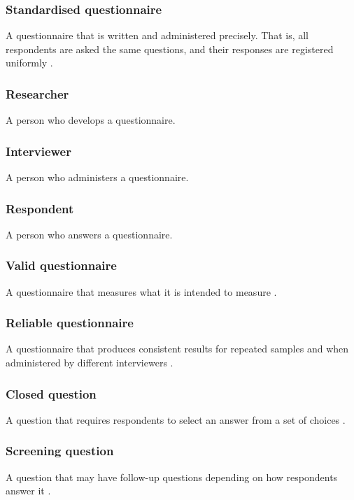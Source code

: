 \subsubsection{Standardised questionnaire}
A questionnaire that is written and administered precisely. That is, all respondents are asked the same questions, and their responses are registered uniformly \autocite{Boynton2004c}.

\subsubsection{Researcher}
A person who develops a questionnaire.

\subsubsection{Interviewer}
A person who administers a questionnaire.

\subsubsection{Respondent}
A person who answers a questionnaire.

\subsubsection{Valid questionnaire}
A questionnaire that measures what it is intended to measure \autocite{Boynton2004c}.

\subsubsection{Reliable questionnaire}
A questionnaire that produces consistent results for repeated samples and when administered by different interviewers \autocite{Boynton2004c}.

\subsubsection{Closed question}
A question that requires respondents to select an answer from a set of choices \autocite{Krosnick2009}.

\subsubsection{Screening question}
A question that may have follow-up questions depending on how respondents answer it \autocite{Krosnick2009}.

